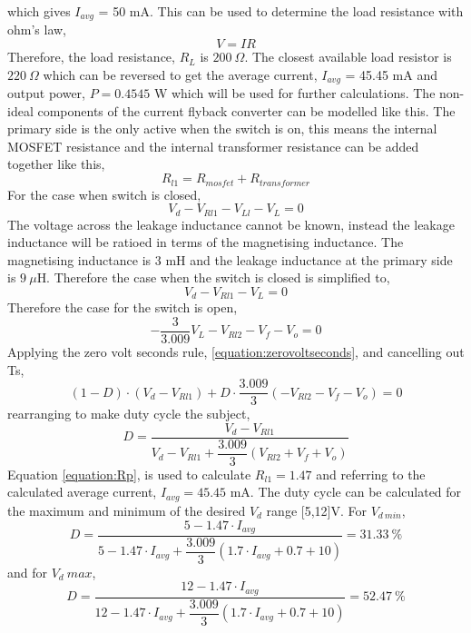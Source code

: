 \documentclass[12pt,twoside]{scrartcl}
\begin{document}
    which gives $I_{avg}$ = 50 mA. This can be used to determine the load resistance with ohm's law,
    \begin{equation}
        V = IR
    \end{equation}
    Therefore, the load resistance, $R_L$ is $200\: \Omega$. The closest available load resistor is $220\: \Omega$ which can be reversed to get the average current,
    $I_{avg}$ = 45.45 mA and output power, $P = 0.4545$ W which will be used for further calculations.
    The non-ideal components of the current flyback converter can be 
    modelled like this. The primary side is the only active when the 
    switch is on, this means the internal MOSFET resistance and the internal 
    transformer resistance can be added together like this,
    \begin{equation}
        R_{l1} = R_{mosfet} + R_{transformer}
        \label{equation:Rp}
    \end{equation}
    For the case when switch is closed,
    \begin{equation}
        V_d - V_{Rl1} - V_{Ll} - V_L = 0
    \end{equation}
    The voltage across the leakage inductance cannot be known, instead the 
    leakage inductance will be ratioed in terms of the magnetising inductance. The magnetising 
    inductance is $3$ mH and the leakage inductance at the primary side is $9\:\mu$H. Therefore the case when
    the switch is closed is simplified to,
    \begin{equation}
        V_d - V_{Rl1} - V_L = 0
    \end{equation}
    Therefore the case for the switch is open,
    \begin{equation}
        -\dfrac{3}{3.009}V_L - V_{Rl2} - V_f - V_o = 0
    \end{equation}
    Applying the zero volt seconds rule, \ref{equation:zerovoltseconds}, and cancelling out Ts,
    \begin{equation}
        (1-D) \cdot( V_d - V_{Rl1} ) +  D\cdot \dfrac{3.009}{3}(- V_{Rl2} - V_f - V_o) = 0
    \end{equation}
    rearranging to make duty cycle the subject,
    \begin{equation}
        D  = \frac{V_d - V_{Rl1}}{V_d - V_{Rl1} + \dfrac{3.009}{3}(V_{Rl2} + V_f + V_o)}
    \end{equation}
    Equation \ref{equation:Rp}, is used to calculate $R_{l1} = 1.47$ and referring to the 
    calculated average current, $I_{avg} = 45.45$ mA. The duty cycle can 
    be calculated for the maximum and minimum of the desired $V_d$ range [5,12]V. For $V_{d\:min}$,
    \begin{equation}
        D  = \frac{5 - 1.47\cdot I_{avg}}{5 - 1.47\cdot I_{avg} + \dfrac{3.009}{3}(1.7\cdot I_{avg} + 0.7 + 10)} = 31.33\: \%
    \end{equation}
    and for $V_d\:max$,
    \begin{equation}
        D  = \frac{12 - 1.47\cdot I_{avg}}{12 - 1.47\cdot I_{avg} + \dfrac{3.009}{3}(1.7\cdot I_{avg} + 0.7 + 10)} = 52.47\: \%
    \end{equation}
\end{document}
